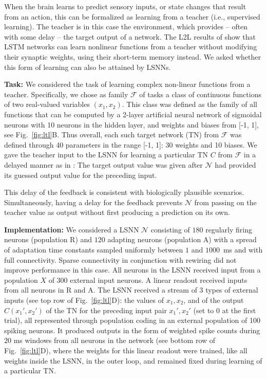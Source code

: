 \documentclass{article} \pdfoutput=1
\begin{document}
When the brain learns to predict sensory inputs, or state changes that result from an action, this can be formalized as learning from a teacher (i.e., supervised learning).
The teacher is in this case the environment, which provides -- often with some delay -- the target output of a network.
The L2L results of \cite{hochreiter2001learning} show that LSTM networks can learn nonlinear functions from a teacher without modifying their synaptic weights, using their short-term memory instead.
We asked whether this form of learning can also be attained by LSNNs.

\textbf{Task:}
We considered the task of learning complex non-linear functions from a teacher. 
Specifically, we chose as family $\mathcal{F}$ of tasks a class of continuous functions of two real-valued variables $(x_1,x_2)$. This class was defined as the family of all functions that can be computed by a 2-layer artificial neural network of sigmoidal neurons with 10 neurons in the hidden layer, and weights and biases from [-1, 1], see Fig.~\ref{fig:ltl}B.
Thus overall, each such target network (TN) from $\mathcal{F}$ was defined through 40 parameters in the range [-1, 1]: 30 weights and 10 biases. 
We gave the teacher input to the LSNN for learning a particular TN $C$ from $\mathcal{F}$ in a delayed manner as in \cite{hochreiter2001learning}: The target output value was given after $\mathcal{N}$ had provided its guessed output value for the preceding input.

This delay of the feedback is consistent with biologically plausible scenarios. 
Simultaneously, having a delay for the feedback prevents $\mathcal{N}$ from passing on the teacher value as output without first producing a prediction on its own.


\textbf{Implementation:}
We considered a LSNN $\mathcal{N}$ consisting of $180$ regularly firing neurons (population R) and $120$ adapting neurons (population A)
with a spread of adaptation time constants sampled uniformly between $1$ and $1000$~ms and with full connectivity.
Sparse connectivity in conjunction with rewiring did not improve performance in this case.
All neurons in the LSNN received input from a population $X$ of 300 external input neurons.
A linear readout received inputs from all neurons in R and A.
The LSNN received a stream of 3 types of external inputs (see top row of Fig.~\ref{fig:ltl}D): the values of $x_1, x_2$, and of the output $C(x_1', x_2')$ of the TN for the preceding input pair $x_1', x_2'$ (set to 0 at the first trial), all represented through population coding in an external population of 100 spiking neurons.
It produced outputs in the form of weighted spike counts during $20$ ms windows from all neurons in the network (see bottom row of Fig.~\ref{fig:ltl}D), where the weights for this linear readout were trained, like all weights inside the LSNN, in the outer loop, and remained fixed during learning of a particular TN. 
\end{document}
